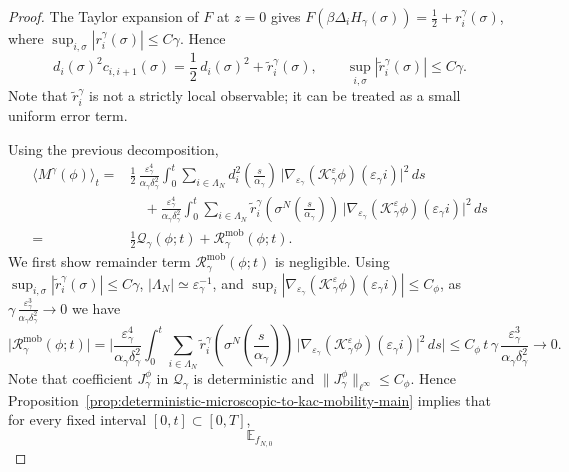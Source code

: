 \documentclass{article}
\begin{document}
\begin{proof}
The Taylor expansion of \(F\) at $z =0$ gives $F(\beta\Delta_iH_\gamma(\sigma))
=
\frac12+r_i^\gamma(\sigma)$, where \( \sup_{i,\sigma}|r_i^\gamma(\sigma)|\le C\gamma. \)
Hence
\[
d_i(\sigma)^2c_{i,i+1}(\sigma)
=
\frac12\,d_i(\sigma)^2+\widetilde r_i^\gamma(\sigma),
\qquad
\sup_{i,\sigma}|\widetilde r_i^\gamma(\sigma)|\le C\gamma.
\]
Note that \(\widetilde r_i^\gamma\) is not a strictly local observable; it can be treated as a small uniform error term.

Using the previous decomposition,
\begin{align}\label{eq:qv-decomposition-1}
    \langle M^\gamma(\phi)\rangle_t
= &
\frac12\,\frac{\varepsilon_\gamma^4}{\alpha_\gamma\delta_\gamma^2}
\int_0^t
\sum_{i\in\Lambda_N}
d_i^2\!\left(\frac{s}{\alpha_\gamma}\right)\,
\Big|
\nabla_{\varepsilon_\gamma}(\mathcal K_\gamma^\varepsilon\phi)(\varepsilon_\gamma i)\Big|^2\,ds \nonumber  \\
& \quad + \frac{\varepsilon_\gamma^4}{\alpha_\gamma\delta_\gamma^2}
\int_0^t
\sum_{i\in\Lambda_N}
\widetilde r_i^\gamma\!\left(\sigma^N \left(\frac{s}{\alpha_\gamma}\right)\right)\,
\Big|
\nabla_{\varepsilon_\gamma}(\mathcal K_\gamma^\varepsilon\phi)(\varepsilon_\gamma i)
\Big|^2\,ds \nonumber \\
= & \frac{1}{2}\mathcal Q_\gamma(\phi;t) + \mathcal R_\gamma^{\mathrm{mob}}(\phi;t).
\end{align}
We first show remainder term $\mathcal R_\gamma^{\mathrm{mob}}(\phi;t)$ is negligible.
Using \(\sup_{i,\sigma}|\widetilde r_i^\gamma(\sigma)|\le C\gamma\),
\(|\Lambda_N|\simeq\varepsilon_\gamma^{-1}\), and
\(\sup_i|\nabla_{\varepsilon_\gamma}(\mathcal K_\gamma^\varepsilon\phi)
(\varepsilon_\gamma i)|\le C_\phi\), as
\(\gamma\,\frac{\varepsilon_\gamma^3}{\alpha_\gamma\delta_\gamma^2}\to0\) we have
\[
 \big|\mathcal R_\gamma^{\mathrm{mob}}(\phi;t)\big|=\Big| \frac{\varepsilon_\gamma^4}{\alpha_\gamma\delta_\gamma^2}
\int_0^t
\sum_{i\in\Lambda_N}
\widetilde r_i^\gamma\!\left(\sigma^N \left(\frac{s}{\alpha_\gamma}\right)\right)\,
\Big| \nabla_{\varepsilon_\gamma}(\mathcal K_\gamma^\varepsilon\phi)(\varepsilon_\gamma i)\Big|^2\,ds \Big|
\le
C_\phi\,t\,
\gamma\,\frac{\varepsilon_\gamma^3}{\alpha_\gamma\delta_\gamma^2} \to 0.
\]
Note that coefficient \(J_\gamma^\phi\) in $\mathcal Q_\gamma$ is deterministic and \(\|J_\gamma^\phi\|_{\ell^\infty}\le C_\phi\).  
Hence Proposition~\ref{prop:deterministic-microscopic-to-kac-mobility-main} implies that for every fixed
interval \([0,t]\subset[0,T]\),
\begin{equation}
    \mathbb E_{f_{N,0}}

\end{equation}
\end{proof}
\end{document}
